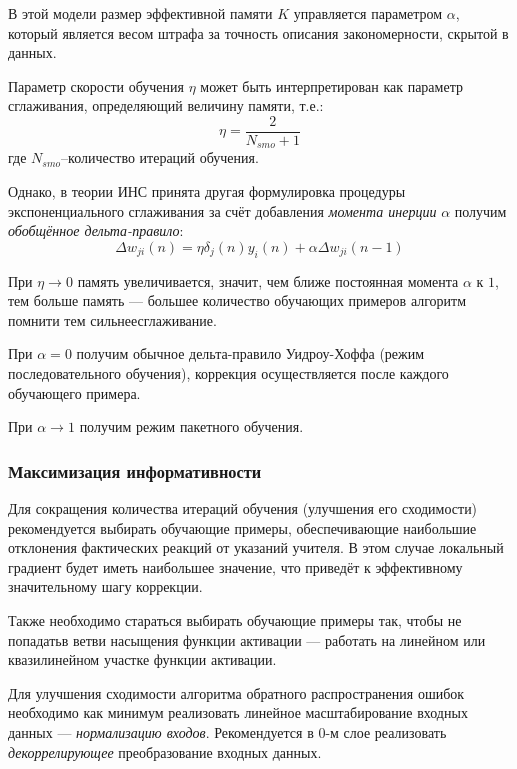 \documentclass{article}
\numberwithin{equation}{subsection}
\begin{document}
В этой модели размер эффективной памяти $K$ управляется параметром $\alpha$, который является
весом штрафа за точность описания закономерности, скрытой в данных.

Параметр скорости обучения $\eta$ может быть интерпретирован как параметр сглаживания,
определяющий величину памяти, т.е.:
\begin{equation}
    \eta = \dfrac{2}{N_{smo}+1}
\end{equation}
где $N_{smo}$--количество итераций обучения.

Однако, в теории ИНС принята другая формулировка процедуры экспоненциального
сглаживания за счёт добавления \textit{момента инерции} $\alpha$ получим
\textit{обобщённое дельта-правило}:
\begin{equation}
    \Delta w_{ji}(n) = \eta \delta_j(n) y_i(n) + \alpha \Delta w_{ji}(n-1)
\end{equation}

При $\eta \to 0$ память увеличивается, значит, чем ближе постоянная момента $\alpha$
к $1$, тем больше память --- большее количество обучающих примеров алгоритм 
\glqq помнит\grqq и тем \glqq сильнее\grqq сглаживание.

При $\alpha=0$ получим обычное дельта-правило Уидроу-Хоффа
(режим последовательного обучения), коррекция осуществляется после каждого
обучающего примера. 

При $\alpha \to 1$ получим режим пакетного обучения. 




\subsubsection{Максимизация информативности}

Для сокращения количества итераций обучения (улучшения его сходимости) рекомендуется
выбирать обучающие примеры, обеспечивающие наибольшие отклонения фактических реакций 
от указаний учителя. В этом случае локальный градиент будет иметь наибольшее значение,
что приведёт к эффективному значительному шагу коррекции. 

Также необходимо стараться выбирать обучающие примеры так, чтобы
не \glqq попадать\grqq в ветви насыщения функции активации --- работать на линейном
или квазилинейном участке функции активации.

Для улучшения сходимости алгоритма обратного распространения ошибок необходимо как минимум 
реализовать линейное масштабирование входных данных --- \textit{нормализацию входов}.
Рекомендуется в $0$-м слое реализовать \textit{декоррелирующее} преобразование 
входных данных.
\end{document}

